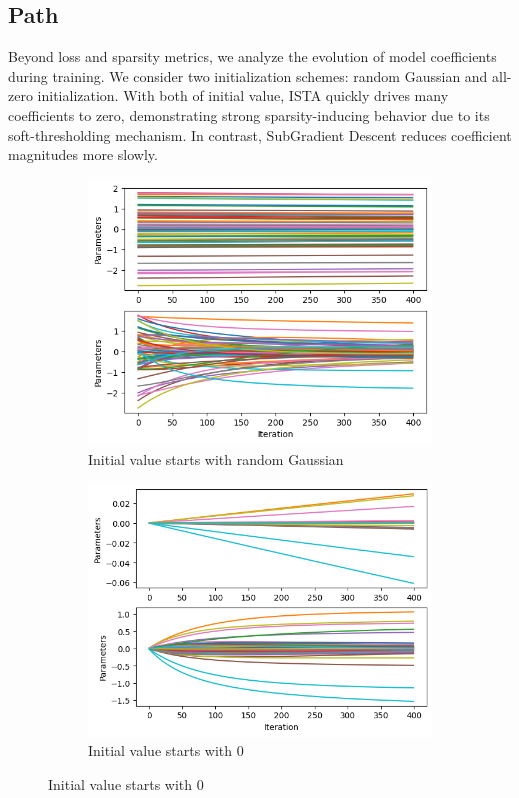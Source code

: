 \documentclass[11pt]{article}
\begin{document}
\subsection{Path}
Beyond loss and sparsity metrics, we analyze the evolution of model coefficients during training.
We consider two initialization schemes: random Gaussian and all-zero initialization. With both of initial value, ISTA quickly drives many coefficients to zero, demonstrating strong sparsity-inducing behavior due to its soft-thresholding mechanism. In contrast, SubGradient Descent reduces coefficient magnitudes more slowly.
\begin{figure}[H]
    \centering
    \begin{subfigure}[b]{0.45\textwidth}
        \includegraphics[width=\textwidth]{figures/fig3.png}
        \caption{Initial value starts with random Gaussian}
        \label{fig:sub1}
    \end{subfigure}
    \hfill
    \begin{subfigure}[b]{0.45\textwidth}
        \includegraphics[width=\textwidth]{figures/fig4.png}
        \caption{Initial value starts with 0}
        \label{fig:sub2}
    \end{subfigure}
    \label{fig:main}
\end{figure}
\end{document}
